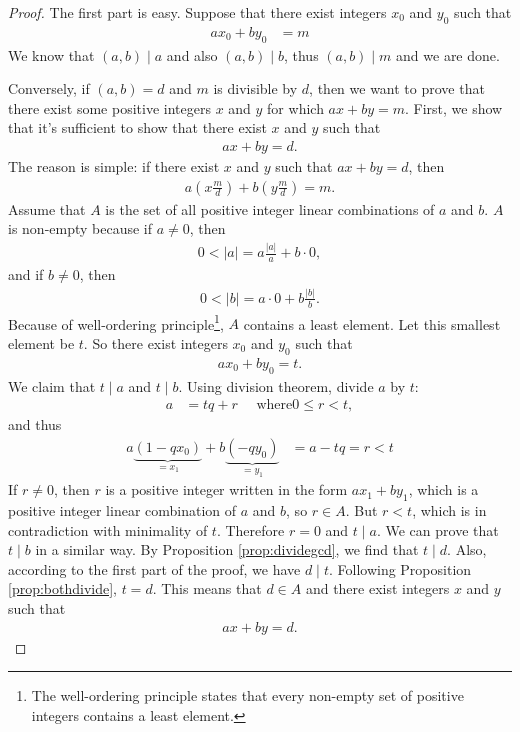 \documentclass{subfile}
\begin{document}
	\begin{proof}
		The first part is easy. Suppose that there exist integers $x_0$ and $y_0$ such that
		\begin{align*}
			ax_0 + by_0
				& = m
		\end{align*}
		We know that $(a,b)\mid a$ and also $(a,b)\mid b$, thus $(a,b)\mid m$ and we are done.

		Conversely, if $(a,b)=d$ and $m$ is divisible by $d$, then we want to prove that there exist some positive integers $x$ and $y$ for which $ax+by=m$. First, we show that it's sufficient to show that there exist $x$ and $y$ such that
		\begin{align*} ax + by = d.\end{align*}
		The reason is simple: if there exist $x$ and $y$ such that $ax + by = d$, then
		\begin{align*} a\left( x \frac{m}{d} \right)  + b \left( y \frac{m}{d} \right) = m.\end{align*}
		Assume that $A$ is the set of all positive integer linear combinations of $a$ and $b$. $A$ is non-empty because if $a \neq 0$, then
		\begin{align*}	0<|a| = a\frac{|a|}{a} + b\cdot 0, \end{align*}
		and if $b \neq 0$, then
		\begin{align*}	0<|b| =  a\cdot 0 + b \frac{|b|}{b}. \end{align*}
		Because of well-ordering principle\footnote{The well-ordering principle states that every non-empty set of positive integers contains a least element.}, $A$ contains a least element. Let this smallest element be $t$. So there exist integers $x_0$ and $y_0$ such that
		\begin{align*} ax_0 + by_0 = t.\end{align*}
		We claim that $t\mid a$ and $t\mid b$. Using division theorem, divide $a$ by $t$:
		\begin{align*}
			a
				& = tq+r\quad\mbox{ where}0 \leq r < t,
		\end{align*}
		and thus
		\begin{align*}
			a\underbrace{(1-qx_0)}_{=x_1}+b\underbrace{(-qy_0)}_{=y_1}
				& =a-tq=r<t
		\end{align*}
		If $r \neq 0$, then $r$ is a positive integer written in the form $ax_1+by_1$, which is a positive integer linear combination of $a$ and $b$, so $r \in A$. But $r<t$, which is in contradiction with minimality of $t$. Therefore $r=0$ and $t\mid a$. We can prove that $t\mid b$ in a similar way. By Proposition \ref{prop:dividegcd}, we find that $t\mid d$. Also, according to the first part of the proof, we have $d\mid t$. Following Proposition \ref{prop:bothdivide}, $t=d$. This means that $d \in A$ and there exist integers $x$ and $y$ such that
		\begin{align*} ax + by = d.\end{align*}
	\end{proof}
\end{document}
